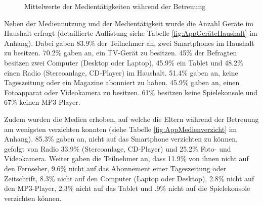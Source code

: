 \begin{figure}%
\caption{Mittelwerte der Medientätigkeiten während der Betreuung}\label{fig:Medientätigkeit}
{}
\end{figure}

Neben der Mediennutzung und der Medientätigkeit wurde die Anzahl Geräte im Haushalt erfragt (detaillierte Auflistung siehe Tabelle \ref{fig:AppGeräteHaushalt} im Anhang). Dabei gaben 83.9\% der Teilnehmer an, zwei Smartphones im Haushalt zu besitzen. 70.2\% gaben an, ein TV-Gerät zu besitzen. 45\% der Befragten besitzen zwei Computer (Desktop oder Laptop), 45.9\% ein Tablet und 48.2\% einen Radio (Stereoanlage, CD-Player) im Haushalt. 51.4\% gaben an, keine Tageszeitung oder ein Magazine abonniert zu haben. 45.9\% gaben an, einen Fotoapparat oder Videokamera zu besitzen. 61\% besitzen keine Spielekonsole und 67\% keinen MP3 Player.

Zudem wurden die Medien erhoben, auf welche die Eltern während der Betreuung am wenigsten verzichten konnten (siehe Tabelle \ref{fig:AppMedienverzicht} im Anhang). 85.3\% gaben an, nicht auf das Smartphone verzichten zu können, gefolgt von Radio 33.9\% (Stereoanlage, CD-Player) und 25.2\% Foto- und Videokamera. Weiter gaben die Teilnehmer an, dass 11.9\% von ihnen nicht auf den Fernseher, 9.6\% nicht auf das Abonnement einer Tageszeitung oder Zeitschrift, 8.3\% nicht auf den Computer (Laptop oder Desktop), 2.8\% nicht auf den MP3-Player, 2.3\% nicht auf das Tablet und .9\% nicht auf die Spielekonsole verzichten können.

